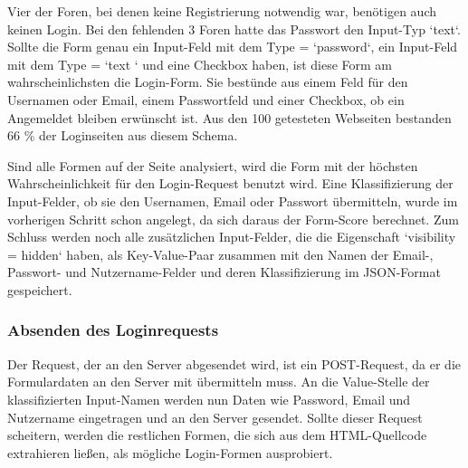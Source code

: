 Vier der Foren, bei denen keine Registrierung notwendig war, benötigen auch keinen Login. Bei den fehlenden 3 Foren hatte das Passwort den Input-Typ `text`.
Sollte die Form genau ein Input-Feld mit dem Type = `password`, ein Input-Feld mit dem Type = `text ` und eine Checkbox haben, ist diese Form am wahrscheinlichsten die Login-Form. Sie bestünde aus einem Feld für den Usernamen oder Email, einem Passwortfeld und einer Checkbox, ob ein Angemeldet bleiben erwünscht ist. Aus den 100 getesteten Webseiten bestanden 66 \% der Loginseiten aus diesem Schema.

Sind alle Formen auf der Seite analysiert, wird die Form mit der höchsten Wahrscheinlichkeit für den Login-Request benutzt wird. Eine Klassifizierung der Input-Felder, ob sie den Usernamen, Email oder Passwort übermitteln, wurde im vorherigen Schritt schon angelegt, da sich daraus der Form-Score berechnet. Zum Schluss werden noch alle zusätzlichen Input-Felder, die die Eigenschaft `visibility = hidden` haben, als Key-Value-Paar zusammen mit den Namen der Email-, Passwort- und Nutzername-Felder und deren Klassifizierung im JSON-Format gespeichert.

\subsubsection{Absenden des Loginrequests}
Der Request, der an den Server abgesendet wird, ist ein POST-Request, da er die Formulardaten an den Server mit übermitteln muss.
An die Value-Stelle der klassifizierten Input-Namen werden nun Daten wie Password, Email und Nutzername eingetragen und an den Server gesendet.
Sollte dieser Request scheitern, werden die restlichen Formen, die sich aus dem HTML-Quellcode extrahieren ließen, als mögliche Login-Formen ausprobiert.

